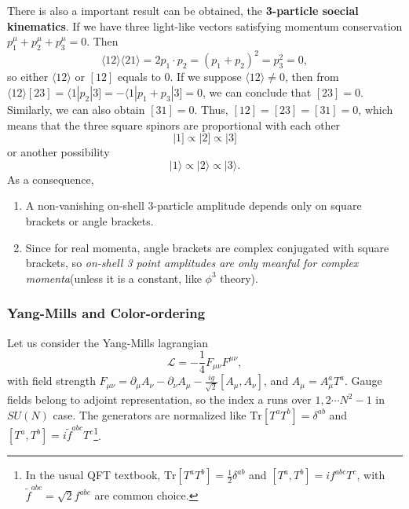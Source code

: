 \documentclass[12pt]{article}
\numberwithin{equation}{section}
\newcommand{\mdavg}[2]{\langle #1 \rangle\!\langle #2 \rangle}
\newcommand{\avg}[1]{\langle #1 \rangle}
\newcommand{\aket}[1]{|#1\rangle}
\begin{document}
There is also a important result can be obtained, the \textbf{3-particle soecial kinematics}. If we have three light-like vectors satisfying momentum conservation
$p_1^\mu+p_2^\mu+p_3^\mu=0$. Then
\begin{equation}
    \mdavg{12}{21}=2p_1\cdot p_2=(p_1+p_2)^2=p_3^2=0,
\end{equation}
so either $\avg{12}$ or $[12]$ equals to 0. If we suppose $\avg{12}\neq0$, then from $\avg{12}[23]=\langle 1|p_2|3]=-\langle 1|p_1+p_3|3]=0$, we can conclude that
$[23]=0$. Similarly, we can also obtain $[31]=0$. Thus, $[12]=[23]=[31]=0$, which means that the three square spinors are proportional with each other
\begin{equation}
    |1] \propto |2] \propto |3]
\end{equation}
or another possibility
\begin{equation}
    \aket{1}\propto\aket{2}\propto\aket{3}.
\end{equation}
As a consequence,
\begin{enumerate}
    \item A non-vanishing on-shell 3-particle amplitude depends only on square brackets or angle brackets.
    \item Since for real momenta, angle brackets are complex conjugated with square brackets, so \textit{on-shell 3 point amplitudes are only meanful for complex momenta}(unless it is a constant, like $\phi^3$ theory).
\end{enumerate}
\subsubsection{Yang-Mills and Color-ordering}
Let us consider the Yang-Mills lagrangian
\begin{equation}
    \mathcal{L}=-\frac{1}{4}F_{\mu\nu}F^{\mu\nu},
\end{equation}
with field strength $F_{\mu\nu}=\partial_\mu A_\nu -  \partial_\nu A_\mu - \frac{ig}{\sqrt{2}}[A_\mu,A_\nu]$, and $A_\mu=A_\mu^a T^a$. Gauge fields belong to adjoint representation, so the index a runs over $1,2 \cdots N^2-1$ in $SU(N)$ case. The generators are normalized like $\textrm{Tr}[T^aT^b]=\delta^{ab}$ and $[T^a,T^b]=i\tilde{f}^{abc}T^c$\footnote{In the usual QFT textbook,
$\textrm{Tr}[T^aT^b]=\frac{1}{2}\delta^{ab}$ and $[T^a,T^b]=if^{abc}T^c$, with $\tilde{f}^{abc}=\sqrt{2}f^{abc}$ are common choice.  }. 
\end{document}
